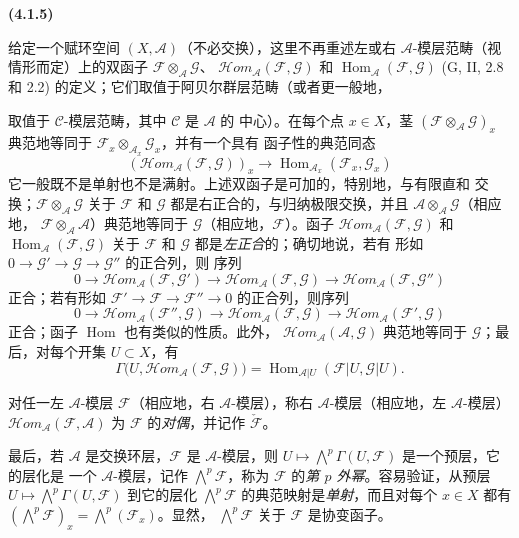 \documentclass[UTF8,fontset=none,11pt,oneside,openany]{ctexbook}
\newenvironment{env}[1][]{%
  \par\medskip\noindent\textbf{(#1)}\ %
}{\par}
\newcommand{\oldpage}[2][]{%
  \hypertarget{ega-source-page-#1-#2}{}%
  \marginnote{\scriptsize\textbf{#1}~|~#2}\ignorespaces}
\let\EGAOriginalLabel\label
\renewcommand{\label}[1]{\phantomsection\EGAOriginalLabel{#1}}
\begin{document}
\begin{env}[4.1.5]
\label{0.4.1.5-fr}
给定一个赋环空间 $(X,\mathcal{A})$（不必交换），这里不再重述左或右
$\mathcal{A}$-模层范畴（视情形而定）上的双函子
$\mathcal{F}\otimes_{\mathcal{A}}\mathcal{G}$、
$\mathcal{H}\!om_{\mathcal{A}}(\mathcal{F},\mathcal{G})$ 和
$\operatorname{Hom}_{\mathcal{A}}(\mathcal{F},\mathcal{G})$
(G, II, 2.8 和 2.2) 的定义；它们取值于阿贝尔群层范畴（或者更一般地，

\oldpage[0\textsubscript{I}]{38}
取值于 $\mathcal{C}$-模层范畴，其中 $\mathcal{C}$ 是 $\mathcal{A}$ 的
中心）。在每个点 $x\in X$，茎
$(\mathcal{F}\otimes_{\mathcal{A}}\mathcal{G})_x$ 典范地等同于
$\mathcal{F}_x\otimes_{\mathcal{A}_x}\mathcal{G}_x$，并有一个具有
函子性的典范同态
\[
  (\mathcal{H}\!om_{\mathcal{A}}(\mathcal{F},\mathcal{G}))_x
  \longrightarrow
  \operatorname{Hom}_{\mathcal{A}_x}(\mathcal{F}_x,\mathcal{G}_x)
\]
它一般既不是单射也不是满射。上述双函子是可加的，特别地，与有限直和
交换；$\mathcal{F}\otimes_{\mathcal{A}}\mathcal{G}$ 关于
$\mathcal{F}$ 和 $\mathcal{G}$ 都是右正合的，与归纳极限交换，并且
$\mathcal{A}\otimes_{\mathcal{A}}\mathcal{G}$（相应地，
$\mathcal{F}\otimes_{\mathcal{A}}\mathcal{A}$）典范地等同于
$\mathcal{G}$（相应地，$\mathcal{F}$）。函子
$\mathcal{H}\!om_{\mathcal{A}}(\mathcal{F},\mathcal{G})$ 和
$\operatorname{Hom}_{\mathcal{A}}(\mathcal{F},\mathcal{G})$ 关于
$\mathcal{F}$ 和 $\mathcal{G}$ 都是\emph{左正合}的；确切地说，若有
形如 $0\to\mathcal{G}'\to\mathcal{G}\to\mathcal{G}''$ 的正合列，则
序列
\[
  0\longrightarrow
  \mathcal{H}\!om_{\mathcal{A}}(\mathcal{F},\mathcal{G}')
  \longrightarrow
  \mathcal{H}\!om_{\mathcal{A}}(\mathcal{F},\mathcal{G})
  \longrightarrow
  \mathcal{H}\!om_{\mathcal{A}}(\mathcal{F},\mathcal{G}'')
\]
正合；若有形如
$\mathcal{F}'\to\mathcal{F}\to\mathcal{F}''\to0$ 的正合列，则序列
\[
  0\longrightarrow
  \mathcal{H}\!om_{\mathcal{A}}(\mathcal{F}'',\mathcal{G})
  \longrightarrow
  \mathcal{H}\!om_{\mathcal{A}}(\mathcal{F},\mathcal{G})
  \longrightarrow
  \mathcal{H}\!om_{\mathcal{A}}(\mathcal{F}',\mathcal{G})
\]
正合；函子 $\operatorname{Hom}$ 也有类似的性质。此外，
$\mathcal{H}\!om_{\mathcal{A}}(\mathcal{A},\mathcal{G})$ 典范地等同于
$\mathcal{G}$；最后，对每个开集 $U\subset X$，有
\[
  \Gamma\bigl(U,\mathcal{H}\!om_{\mathcal{A}}(\mathcal{F},\mathcal{G})\bigr)
  =
  \operatorname{Hom}_{\mathcal{A}|U}(\mathcal{F}|U,\mathcal{G}|U).
\]

对任一左 $\mathcal{A}$-模层 $\mathcal{F}$（相应地，右
$\mathcal{A}$-模层），称右 $\mathcal{A}$-模层（相应地，左
$\mathcal{A}$-模层）
$\mathcal{H}\!om_{\mathcal{A}}(\mathcal{F},\mathcal{A})$ 为
$\mathcal{F}$ 的\emph{对偶}，并记作 $\check{\mathcal{F}}$。

最后，若 $\mathcal{A}$ 是交换环层，$\mathcal{F}$ 是
$\mathcal{A}$-模层，则
$U\mapsto\bigwedge^p\Gamma(U,\mathcal{F})$ 是一个预层，它的层化是
一个 $\mathcal{A}$-模层，记作 $\bigwedge^p\mathcal{F}$，称为
$\mathcal{F}$ 的\emph{第 $p$ 外幂}。容易验证，从预层
$U\mapsto\bigwedge^p\Gamma(U,\mathcal{F})$ 到它的层化
$\bigwedge^p\mathcal{F}$ 的典范映射是\emph{单射}，而且对每个
$x\in X$ 都有
$(\bigwedge^p\mathcal{F})_x=\bigwedge^p(\mathcal{F}_x)$。显然，
$\bigwedge^p\mathcal{F}$ 关于 $\mathcal{F}$ 是协变函子。
\end{env}
\end{document}
